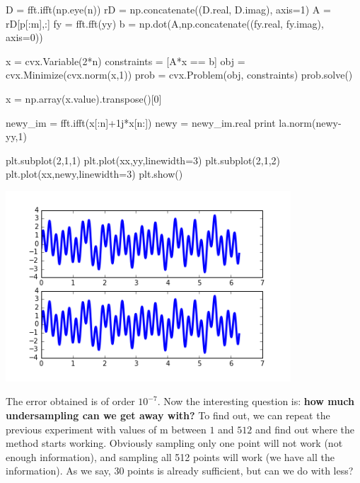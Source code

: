 \documentclass{article}
\begin{document}
\begin{itemize}
\begin{ipythonnb}
D = fft.ifft(np.eye(n))
rD = np.concatenate((D.real, D.imag), axis=1)
A = rD[p[:m],:]
fy = fft.fft(yy)
b = np.dot(A,np.concatenate((fy.real, fy.imag), axis=0))
\end{ipythonnb}

\begin{ipythonnb}
x = cvx.Variable(2*n)
constraints = [A*x == b]
obj = cvx.Minimize(cvx.norm(x,1))
prob = cvx.Problem(obj, constraints)
prob.solve()

x = np.array(x.value).transpose()[0]
\end{ipythonnb}

\begin{ipythonnb}
newy_im = fft.ifft(x[:n]+1j*x[n:])
newy = newy_im.real
print la.norm(newy-yy,1)

plt.subplot(2,1,1)
plt.plot(xx,yy,linewidth=3)
plt.subplot(2,1,2)
plt.plot(xx,newy,linewidth=3)
plt.show()
\end{ipythonnb}

\includegraphics[width=0.8\textwidth]{images/43.png}

The error obtained is of order $10^{-7}$. Now the interesting question is: \textbf{how much undersampling can we get away with?} To find out, we can repeat the previous experiment with values of m between $1$ and $512$ and find out where the method starts working. Obviously sampling only one point will not work (not enough information), and sampling all 512 points will work (we have all the information). As we say, $30$ points is already sufficient, but can we do with less?


\end{itemize}
\end{document}

